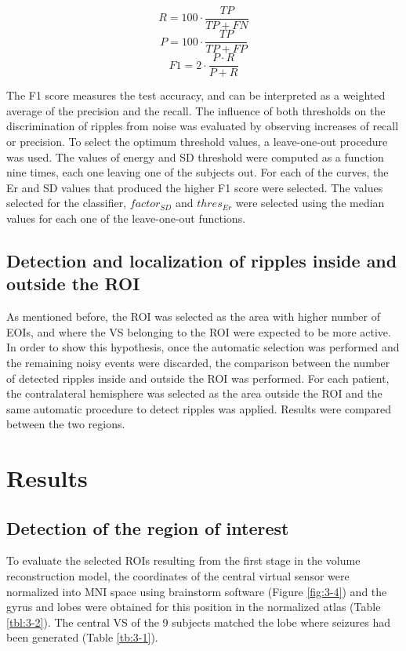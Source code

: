 \begin{equation}
R = 100 \cdot \frac{TP}{TP+FN} 
\end{equation}
\begin{equation}
P = 100 \cdot \frac{TP}{TP+FP}
\end{equation}
\begin{equation}
F1 = 2 \cdot \frac{P \cdot R}{P+R}
\end{equation}

The F1 score measures the test accuracy, and can be interpreted as a weighted average of the precision and the recall. The influence of both thresholds on the discrimination of ripples from noise was evaluated by observing increases of recall or precision. To select the optimum threshold values, a leave-one-out procedure was used. The values of energy and SD threshold were computed as a function nine times, each one leaving one of the subjects out. For each of the curves, the Er and SD values that produced the higher F1 score were selected. The values selected for the classifier, $factor_{SD}$ and $thres_{Er}$ were selected using the median values for each one of the leave-one-out functions. 

\subsection{Detection and localization of ripples inside and outside the ROI} 

As mentioned before, the ROI was selected as the area with higher number of EOIs, and where the VS belonging to the ROI were expected to be more active. In order to show this hypothesis, once the automatic selection was performed and the remaining noisy events were discarded, the comparison between the number of detected ripples inside and outside the ROI was performed. For each patient, the contralateral hemisphere was selected as the area outside the ROI and the same automatic procedure to detect ripples was applied. Results were compared between the two regions.

\section{Results}

\subsection{Detection of the region of interest}

To evaluate the selected ROIs resulting from the first stage in the volume reconstruction model, the coordinates of the central virtual sensor were normalized into MNI space using brainstorm software (Figure \ref{fig:3-4}) and the gyrus and lobes were obtained for this position in the normalized atlas (Table \ref{tbl:3-2}). The central VS of the 9 subjects matched the lobe where seizures had been generated (Table \ref{tb:3-1}). 

